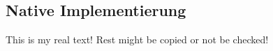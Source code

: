 \subsection{Native Implementierung} \label{subsection:evaluation-modifications-dynamic}
This is my real text! Rest might be copied or not be checked!
